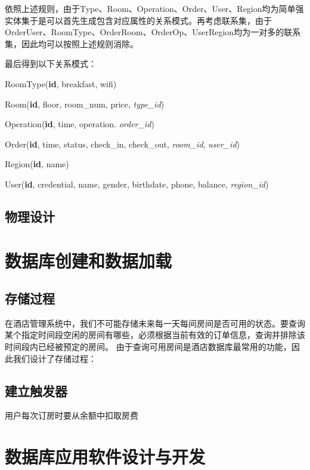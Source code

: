\documentclass{myreport}
\begin{document}
依照上述规则，由于Type、Room、Operation、Order、User、Region均为简单强实体集于是可以首先生成包含对应属性的关系模式。再考虑联系集，由于OrderUser、RoomType、OrderRoom、OrderOp、UserRegion均为一对多的联系集，因此均可以按照上述规则消除。

最后得到以下关系模式：

RoomType(\textbf{id}, breakfast, wifi)

Room(\textbf{id}, floor, room\_num, price, \textit{type\_id})

Operation(\textbf{id}, time, operation. \textit{order\_id})

Order(\textbf{id}, time, status, check\_in, check\_out, \textit{room\_id}, \textit{user\_id})

Region(\textbf{id}, name)

User(\textbf{id}, credential, name, gender, birthdate, phone, balance, \textit{region\_id})


\section{物理设计}

\chapter{数据库创建和数据加载}
\section{存储过程}
在酒店管理系统中，我们不可能存储未来每一天每间房间是否可用的状态。要查询某个指定时间段空闲的房间有哪些，必须根据当前有效的订单信息，查询并排除该时间段内已经被预定的房间。
由于查询可用房间是酒店数据库最常用的功能，因此我们设计了存储过程：

\section{建立触发器}
用户每次订房时要从余额中扣取房费

\chapter{数据库应用软件设计与开发}


\end{document}

